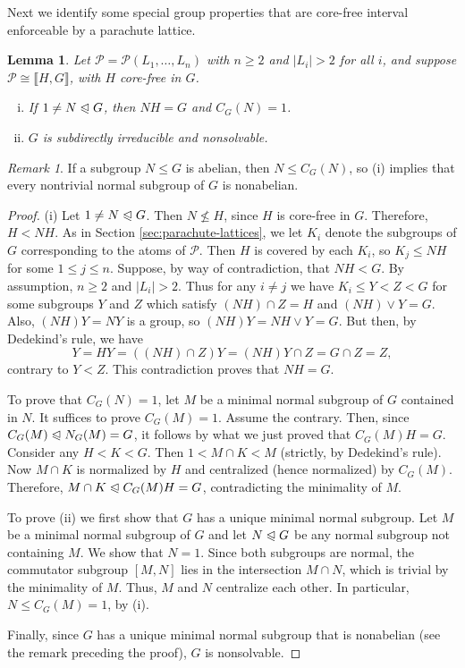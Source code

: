 \documentclass{gen-j-l}
\newcommand{\lb}{\ensuremath{\llbracket}}
\newcommand{\rb}{\ensuremath{\rrbracket}}
\newcommand{\<}{\ensuremath{\langle}}
\renewcommand{\>}{\ensuremath{\rangle}}
\theoremstyle{plain}
\newtheorem{lemma}[theorem]{Lemma}
\theoremstyle{definition}
\theoremstyle{remark}
\newtheorem*{remark}{Remark}
\numberwithin{theorem}{section}
\numberwithin{claim}{section}
\numberwithin{equation}{section}
\numberwithin{conjecture}{section}
\renewcommand{\leq}{\ensuremath{\leqslant}}
\renewcommand{\nleq}{\ensuremath{\nleqslant}}
\renewcommand{\geq}{\ensuremath{\geqslant}}
\newcommand{\subnormal}{\ensuremath{\trianglelefteqslant}}
\newcommand{\join}{\ensuremath{\vee}}
\newcommand{\2}{\ensuremath{\mathbf{2}}}
\newcommand{\3}{\ensuremath{\mathbf{3}}}
\newcommand{\sP}{\ensuremath{\mathscr{P}}}
\begin{document}
Next we identify some special group properties that are core-free interval
enforceable by a parachute lattice.
\begin{lemma}
\label{lemma-wjd-5}
 Let $\sP = \sP(L_1, \dots, L_n)$ with $n\geq 2$ and $|L_i|>2$ for all
$i$, and suppose $\sP \cong \lb H, G \rb$, with $H$ core-free in $G$.  
\begin{enumerate}[(i)]
\item If $1\neq N \subnormal G$, then $NH = G$ and $C_G(N)=1$.
\item $G$ is subdirectly irreducible and nonsolvable.
\end{enumerate}
\end{lemma}
\begin{remark}
If a subgroup $N\leq G$ is abelian, then $N \leq C_G(N)$, so (i) implies
that every nontrivial normal subgroup of $G$ is nonabelian.  
\end{remark}
\begin{proof}
(i)
Let $1\neq N \subnormal G$.  Then $N \nleq H$, since $H$ is core-free in $G$.
Therefore, $H < NH$.   As in Section \ref{sec:parachute-lattices}, we let $K_i$
denote the subgroups of $G$ 
corresponding to the atoms of $\sP$.  
Then $H$ is covered by each $K_i$, so $K_j\leq NH$ for some $1\leq j\leq n$.  
Suppose, by way of contradiction, that $NH < G$.  
By assumption, $n\geq 2$ and $|L_i|>2$.  Thus for any $i\neq j$ we have
$K_i\leq Y < Z < G$ for some subgroups $Y$ and $Z$ which satisfy
$(NH)\cap Z = H$ and $(NH)\join Y = G$.  Also, $(NH)Y = NY$ is a group, so
$(NH)Y=NH\join Y = G$.  But then, by Dedekind's rule, we have
\[
Y = HY = ((NH)\cap Z) Y = (NH)Y \cap Z = G\cap Z = Z,
\]
contrary to $Y<Z$.  This contradiction proves that $NH = G$.

To prove that $C_G(N)=1$, let $M$ be a minimal normal subgroup of $G$
contained in $N$.  It suffices to prove $C_G(M)= 1$.
Assume the contrary. Then, 
since $C_G(M) \subnormal N_G(M) =G$, it follows by
what we just proved that $C_G(M)H = G$.
Consider any $H< K < G$. Then $1 < M\cap K < M$ (strictly, by
Dedekind's rule). Now $M\cap K$ is normalized by $H$ and centralized
(hence normalized) by $C_G(M)$.  
Therefore, $M\cap K \subnormal C_G(M)H = G$, contradicting the minimality of
$M$.  

To prove (ii) we first show that $G$ has a unique minimal normal subgroup.  Let
$M$ be a minimal
normal subgroup of $G$ and let $N \subnormal G$ be any normal subgroup not 
containing $M$.  We show that $N = 1$.  Since both subgroups
are normal, the commutator subgroup
$[M,N]$
lies in the intersection $M\cap N$, which is trivial by the minimality of $M$.   
Thus, $M$ and $N$ centralize each other.  In particular,
$N \leq C_G(M) = 1$, by (i).

Finally, since $G$ has a unique
minimal normal subgroup that is nonabelian 
(see the remark preceding the proof),
$G$ is nonsolvable.
\end{proof}
\end{document}

